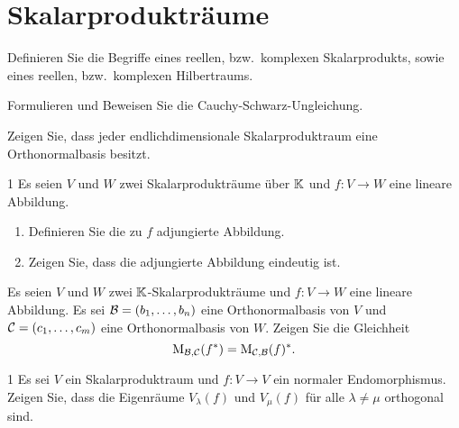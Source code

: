 \section{Skalarprodukträume}




\begin{question}[subtitle = Definitionen]{1}
  Definieren Sie die Begriffe eines reellen, bzw.\ komplexen Skalarprodukts, sowie eines reellen, bzw.\ komplexen Hilbertraums.
\end{question}


\begin{question}[subtitle = Cauchy-Schwarz]{1}
  Formulieren und Beweisen Sie die Cauchy-Schwarz-Ungleichung.
\end{question}


\begin{question}[subtitle = Existenz von Orthonormalbasen]{1}
  Zeigen Sie, dass jeder endlichdimensionale Skalarproduktraum eine Orthonormalbasis besitzt.
\end{question}


\begin{question}[subtitle = Definition und Eindeutigkeit der adjungierten Abbildung]{1}
  Es seien $V$ und $W$ zwei Skalarprodukträume über $\mathbb{K}$ und $f \colon V \to W$ eine lineare Abbildung.
  \begin{enumerate}[leftmargin=*]
    \item
      Definieren Sie die zu $f$ adjungierte Abbildung.
    \item
      Zeigen Sie, dass die adjungierte Abbildung eindeutig ist.
  \end{enumerate}
\end{question}


\begin{question}[subtitle = Darstellende Matrix der adjungiertes Abbildung]{1}
  Es seien $V$ und $W$ zwei $\mathbb{K}$-Skalarprodukträume und $f \colon V \to W$ eine lineare Abbildung.
  Es sei $\mathcal{B} = (b_1, \dotsc, b_n)$ eine Orthonormalbasis von $V$ und $\mathcal{C} = (c_1, \dotsc, c_m)$ eine Orthonormalbasis von $W$.
  Zeigen Sie die Gleichheit
  \[
      \operatorname{M}_{\mathcal{B}, \mathcal{C}}(f^*)
    = \operatorname{M}_{\mathcal{C}, \mathcal{B}}(f)^*.
  \]
\end{question}


\begin{question}[subtitle = Orthogonalität der Eigenräume normaler Endomorphismen]{1}
  Es sei $V$ ein Skalarproduktraum und $f \colon V \to V$ ein normaler Endomorphismus.
  Zeigen Sie, dass die Eigenräume $V_\lambda(f)$ und $V_\mu(f)$ für alle $\lambda \neq \mu$ orthogonal sind.
\end{question}


